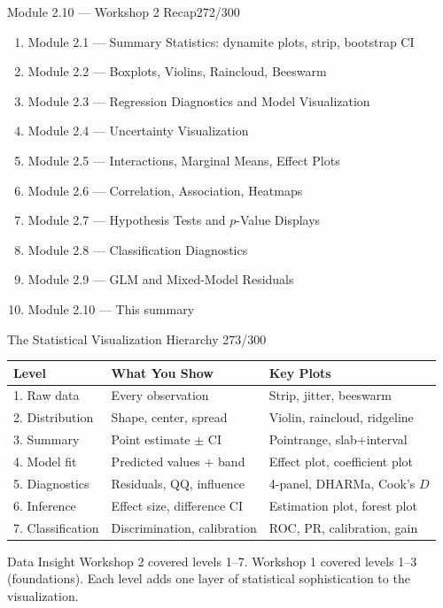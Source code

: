 \documentclass[10pt]{beamer}
\newcommand{\smark}[1]{\hfill{\scriptsize\color{codegray}#1}}
\begin{document}
\begin{frame}{Module 2.10 --- Workshop 2 Recap}\smark{272/300}
\begin{enumerate}
    \item Module 2.1 --- Summary Statistics: dynamite plots, strip, bootstrap CI
    \item Module 2.2 --- Boxplots, Violins, Raincloud, Beeswarm
    \item Module 2.3 --- Regression Diagnostics and Model Visualization
    \item Module 2.4 --- Uncertainty Visualization
    \item Module 2.5 --- Interactions, Marginal Means, Effect Plots
    \item Module 2.6 --- Correlation, Association, Heatmaps
    \item Module 2.7 --- Hypothesis Tests and $p$-Value Displays
    \item Module 2.8 --- Classification Diagnostics
    \item Module 2.9 --- GLM and Mixed-Model Residuals
    \item Module 2.10 --- This summary
\end{enumerate}
\end{frame}

\begin{frame}{The Statistical Visualization Hierarchy}
\smark{273/300}
\centering\small
\begin{tabular}{@{}lll@{}}
    \toprule
    \textbf{Level} & \textbf{What You Show} & \textbf{Key Plots} \\
    \midrule
    1. Raw data        & Every observation          & Strip, jitter, beeswarm \\
    2. Distribution    & Shape, center, spread      & Violin, raincloud, ridgeline \\
    3. Summary         & Point estimate $\pm$ CI    & Pointrange, slab+interval \\
    4. Model fit       & Predicted values + band    & Effect plot, coefficient plot \\
    5. Diagnostics     & Residuals, QQ, influence   & 4-panel, DHARMa, Cook's $D$ \\
    6. Inference       & Effect size, difference CI & Estimation plot, forest plot \\
    7. Classification  & Discrimination, calibration& ROC, PR, calibration, gain \\
    \bottomrule
\end{tabular}

\vspace{0.3cm}
\begin{exampleblock}{Data Insight}
    \scriptsize Workshop 2 covered levels 1--7. Workshop 1 covered levels 1--3 (foundations). Each level adds one layer of statistical sophistication to the visualization.
\end{exampleblock}
\end{frame}
\end{document}
